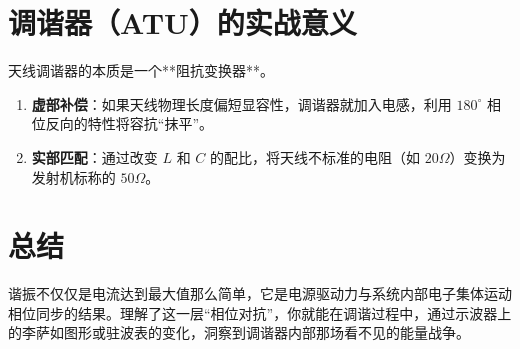\documentclass[11pt,a4paper]{ctexart} %
\begin{document}
	\section{调谐器（ATU）的实战意义}
	天线调谐器的本质是一个**阻抗变换器**。
	\begin{enumerate}
		\item \textbf{虚部补偿}：如果天线物理长度偏短显容性，调谐器就加入电感，利用 $180^\circ$ 相位反向的特性将容抗“抹平”。
		\item \textbf{实部匹配}：通过改变 $L$ 和 $C$ 的配比，将天线不标准的电阻（如 $20\Omega$）变换为发射机标称的 $50\Omega$。
	\end{enumerate}
	
	\section{总结}
	谐振不仅仅是电流达到最大值那么简单，它是电源驱动力与系统内部电子集体运动相位同步的结果。理解了这一层“相位对抗”，你就能在调谐过程中，通过示波器上的李萨如图形或驻波表的变化，洞察到调谐器内部那场看不见的能量战争。
	
\end{document}
